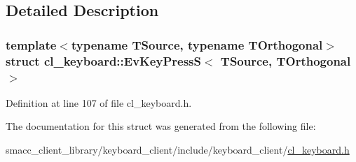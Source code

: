 \subsection{Detailed Description}
\subsubsection*{template$<$typename T\+Source, typename T\+Orthogonal$>$\newline
struct cl\+\_\+keyboard\+::\+Ev\+Key\+Press\+S$<$ T\+Source, T\+Orthogonal $>$}



Definition at line 107 of file cl\+\_\+keyboard.\+h.



The documentation for this struct was generated from the following file\+:\begin{DoxyCompactItemize}
\item 
smacc\+\_\+client\+\_\+library/keyboard\+\_\+client/include/keyboard\+\_\+client/\hyperlink{cl__keyboard_8h}{cl\+\_\+keyboard.\+h}\end{DoxyCompactItemize}
